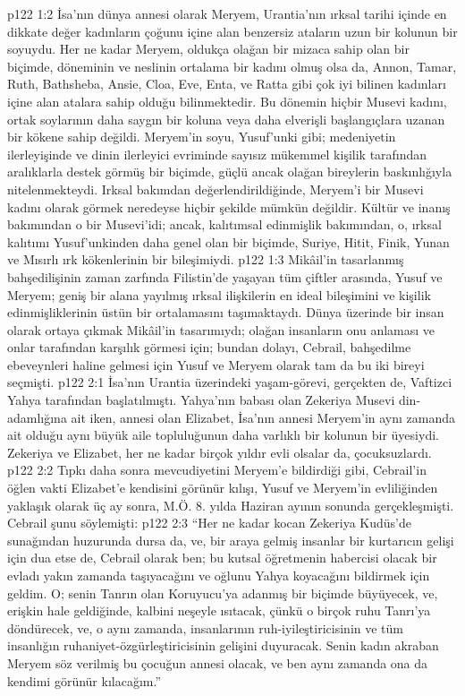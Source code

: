 \vs p122 1:2 İsa’nın dünya annesi olarak Meryem, Urantia’nın ırksal tarihi içinde en dikkate değer kadınların çoğunu içine alan benzersiz ataların uzun bir kolunun bir soyuydu. Her ne kadar Meryem, oldukça olağan bir mizaca sahip olan bir biçimde, döneminin ve neslinin ortalama bir kadını olmuş olsa da, Annon, Tamar, Ruth, Bathsheba, Ansie, Cloa, Eve, Enta, ve Ratta gibi çok iyi bilinen kadınları içine alan atalara sahip olduğu bilinmektedir. Bu dönemin hiçbir Musevi kadını, ortak soylarının daha saygın bir koluna veya daha elverişli başlangıçlara uzanan bir kökene sahip değildi. Meryem’in soyu, Yusuf’unki gibi; medeniyetin ilerleyişinde ve dinin ilerleyici evriminde sayısız mükemmel kişilik tarafından aralıklarla destek görmüş bir biçimde, güçlü ancak olağan bireylerin baskınlığıyla nitelenmekteydi. Irksal bakımdan değerlendirildiğinde, Meryem’i bir Musevi kadını olarak görmek neredeyse hiçbir şekilde mümkün değildir. Kültür ve inanış bakımından o bir Musevi’idi; ancak, kalıtımsal edinmişlik bakımından, o, ırksal kalıtımı Yusuf’unkinden daha genel olan bir biçimde, Suriye, Hitit, Finik, Yunan ve Mısırlı ırk kökenlerinin bir bileşimiydi.
\vs p122 1:3 Mikâil’in tasarlanmış bahşedilişinin zaman zarfında Filistin’de yaşayan tüm çiftler arasında, Yusuf ve Meryem; geniş bir alana yayılmış ırksal ilişkilerin en ideal bileşimini ve kişilik edinmişliklerinin üstün bir ortalamasını taşımaktaydı. Dünya üzerinde  bir insan olarak ortaya çıkmak Mikâil’in tasarımıydı; olağan insanların onu anlaması ve onlar tarafından karşılık görmesi için; bundan dolayı, Cebrail, bahşedilme ebeveynleri haline gelmesi için Yusuf ve Meryem olarak tam da bu iki bireyi seçmişti.
\vs p122 2:1 İsa’nın Urantia üzerindeki yaşam\hyp{}görevi, gerçekten de, Vaftizci Yahya tarafından başlatılmıştı. Yahya’nın babası olan Zekeriya Musevi din\hyp{}adamlığına ait iken, annesi olan Elizabet, İsa’nın annesi Meryem’in aynı zamanda ait olduğu aynı büyük aile topluluğunun daha varlıklı bir kolunun bir üyesiydi. Zekeriya ve Elizabet, her ne kadar birçok yıldır evli olsalar da, çocuksuzlardı.
\vs p122 2:2 Tıpkı daha sonra mevcudiyetini Meryem’e bildirdiği gibi, Cebrail’in öğlen vakti Elizabet’e kendisini görünür kılışı, Yusuf ve Meryem’in evliliğinden yaklaşık olarak üç ay sonra, M.Ö. 8. yılda Haziran ayının sonunda gerçekleşmişti. Cebrail şunu söylemişti:
\vs p122 2:3 “Her ne kadar kocan Zekeriya Kudüs’de sunağından huzurunda dursa da, ve, bir araya gelmiş insanlar bir kurtarıcın gelişi için dua etse de, Cebrail olarak ben; bu kutsal öğretmenin habercisi olacak bir evladı yakın zamanda taşıyacağını ve oğlunu Yahya koyacağını bildirmek için geldim. O; senin Tanrın olan Koruyucu’ya adanmış bir biçimde büyüyecek, ve, erişkin hale geldiğinde, kalbini neşeyle ısıtacak, çünkü o birçok ruhu Tanrı’ya döndürecek, ve, o aynı zamanda, insanlarının ruh\hyp{}iyileştiricisinin ve tüm insanlığın ruhaniyet\hyp{}özgürleştiricisinin gelişini duyuracak. Senin kadın akraban Meryem söz verilmiş bu çocuğun annesi olacak, ve ben aynı zamanda ona da kendimi görünür kılacağım.”
